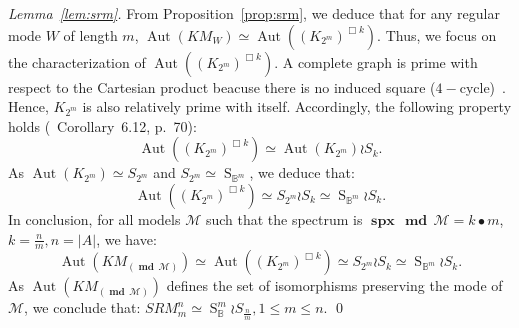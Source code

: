 \documentclass[12pt]{elsarticle}
\newcommand{\Bset}[0]{\mathbb{B}}
\newcommand{\spectrum}[0]{{\operatorname{\textbf{spx}}\,}}
\newcommand{\mode}[0]{\operatorname{\textbf{md}} \,}
\newcommand{\gsym}[1]{\operatorname{S}_{#1}}
\newcommand{\aut}[0]{\operatorname{Aut}}
\begin{document}
\begin{proof}[Lemma~\ref{lem:srm}]
From Proposition~\ref{prop:srm}, we deduce that for any regular mode $W$ of length $m$, $\aut(KM_W) \simeq \aut( (K_{2^m})^{\Box k})$.
Thus, we focus on the characterization of $\aut( (K_{2^m})^{\Box k})$. A complete graph is prime with respect to the Cartesian product beacuse there is no induced square ($4-$cycle)~\cite{Imrich2008}. Hence, $K_{2^m}$ is also relatively prime with itself. Accordingly, the following property holds (\cite{Hammack2011}~Corollary~6.12, p.~70): 
 $$\aut( (K_{2^m})^{\Box k}) \simeq \aut(K_{2^m}) \wr S_k.$$ 
As $\aut(K_{2^m}) \simeq S_{2^m}$ and $ S_{2^m} \simeq \gsym {\Bset^m}$, we deduce that: 
$$\aut( (K_{2^m})^{\Box k}) \simeq S_{2^m} \wr S_k \simeq \gsym {\Bset^m} \wr S_k.$$
In conclusion, for all models $\mathcal M$ such that the spectrum is $\spectrum \mode \mathcal M = k \bullet m $, $k = \frac{n}{m}, n=|A|$, we have:
 $$\aut(KM_{(\mode \mathcal M)}) \simeq \aut( (K_{2^m})^{\Box k}) \simeq S_{2^m} \wr S_k \simeq \gsym{\Bset^m }\wr S_k.$$
 As $\aut(KM_{(\mode \mathcal M)})$ defines the set of isomorphisms preserving the mode of $\mathcal M$, we conclude that: $SRM^n_m \simeq \gsym \Bset^m \wr S_\frac{n}{m}, 1 \leq m \leq n.$
\qed \end{proof}
\end{document}
